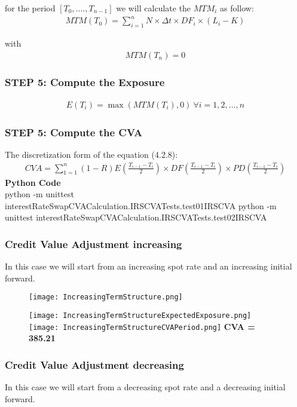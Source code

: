 \documentclass[11pt]{article}
\numberwithin{equation}{subsection}
\begin{document}
\noindent for the period \([T_0,...., T_{n-1}]\) we will calculate the \(MTM_i\) as follow:
\begin{eqnarray*}
	MTM(T_0) = \sum_{i=1}^{n} N \times \Delta t \times DF_i \times (L_i - K) 
\end{eqnarray*}

\noindent with 
\begin{eqnarray*}
	MTM(T_n) = 0
\end{eqnarray*}

\subsubsection*{STEP 5: Compute the Exposure}
\begin{eqnarray*}
	E(T_i) = \max(MTM(T_i), 0) \ \forall i = 1,2,...,n
\end{eqnarray*}

\subsubsection*{STEP 5: Compute the CVA}
The discretization form of the equation (4.2.8):
\begin{eqnarray*}
	CVA = \sum_{1=1}^{n} (1-R) E(\frac{T_{i-1}-T_i}{2}) \times DF(\frac{T_{i-1}-T_i}{2})  \times PD(\frac{T_{i-1}-T_i}{2})
\end{eqnarray*}
\textbf{Python Code}\\
python -m unittest interestRateSwapCVACalculation.IRSCVATests.test01IRSCVA
python -m unittest interestRateSwapCVACalculation.IRSCVATests.test02IRSCVA
\subsubsection*{Credit Value Adjustment increasing}
In this case we will start from an increasing spot rate and an increasing initial forward. 

\begin{figure}[H]
	\texttt{[image: IncreasingTermStructure.png]}
\end{figure}


\begin{figure}[H]
	\texttt{[image: IncreasingTermStructureExpectedExposure.png]}
	\texttt{[image: IncreasingTermStructureCVAPeriod.png]}
	\textbf{CVA = 385.21}
\end{figure}

\newpage
\subsubsection*{Credit Value Adjustment decreasing}
In this case we will start from a decreasing spot rate and a decreasing initial forward.
\end{document}
